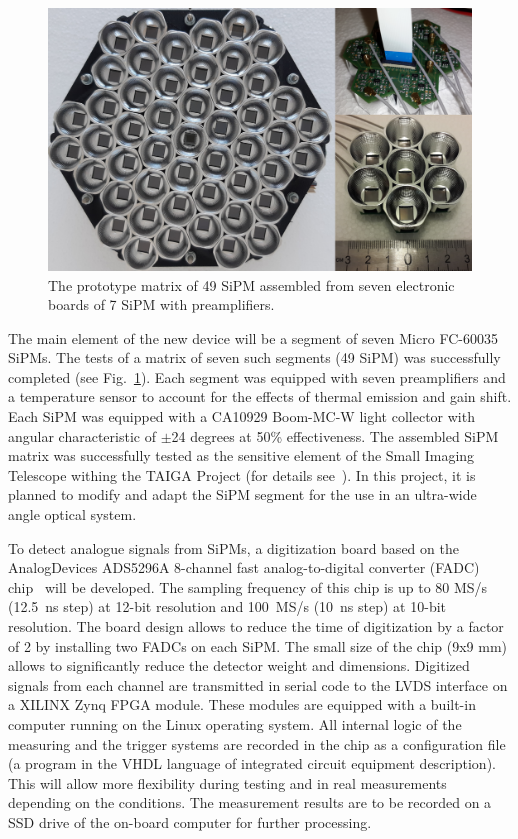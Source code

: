 \documentclass[a4paper,11pt]{article}
\begin{document}
\begin{figure}[t]
\centering %
\includegraphics[width=.55\textwidth]{mosaic_protype.png}
\caption{The prototype matrix of 49 SiPM assembled from seven electronic boards of 7 SiPM with preamplifiers.}
\label{fig:mosaic49_7}
\end{figure}

The main element of the new device will be a segment of seven Micro FC-60035 SiPMs. The tests of a matrix of seven such segments (49 SiPM) was successfully completed (see Fig.~\ref{fig:mosaic49_7}). Each segment was equipped with seven preamplifiers and a temperature sensor to account for the effects of thermal emission and gain shift. Each SiPM was equipped with a CA10929 Boom-MC-W light collector with angular characteristic of $\pm$24 degrees at 50\% effectiveness. The assembled SiPM matrix was successfully tested as the sensitive element of the Small Imaging Telescope withing the TAIGA Project (for details see~\cite{SIT20}). In this project, it is planned to modify and adapt the SiPM segment for the use in an ultra-wide angle optical system.

To detect analogue signals from SiPMs, a digitization board based on the AnalogDevices ADS5296A 8-channel fast analog-to-digital converter (FADC) chip~\cite{FADC} will be developed. The sampling frequency of this chip is up to 80 MS/s (12.5~ns step) at 12-bit resolution and 100~MS/s (10~ns step) at 10-bit resolution.
The board design allows to reduce the time of digitization by a factor of 2 by installing two FADCs on each SiPM.
The small size of the chip (9x9 mm) allows to significantly reduce the detector weight and dimensions. 
Digitized signals from each channel are transmitted in serial code to the LVDS interface on a XILINX Zynq FPGA module.
These modules are equipped with a built-in computer running on the Linux operating system.
All internal logic of the measuring and the trigger systems are recorded in the chip as a configuration file (a program in the VHDL language of integrated circuit equipment description). This will allow more flexibility during testing and in real measurements depending on the conditions.
The measurement results are to be recorded on a SSD drive of the on-board computer for further processing.
\end{document}
